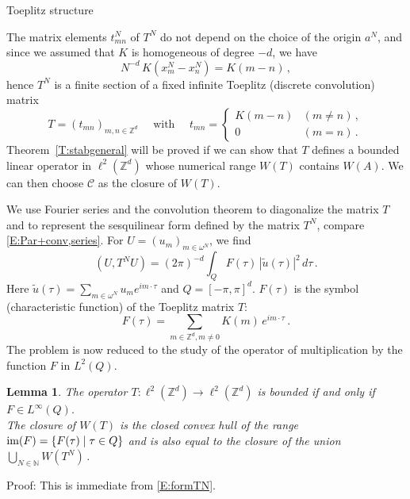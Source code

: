 \documentclass[12pt]{amsart}
\makeatletter
\def\subsection{\@startsection{section}{1}%
  \z@{1.2\linespacing\@plus\linespacing}{.5\linespacing}%
  {\normalfont\scshape\centering}}
\def\subsection{\@startsection{subsection}{2}%
  \z@{0.9\linespacing\@plus.7\linespacing}{-.5em}%
  {\normalfont\bfseries}}
\newtheorem{lemma}[theorem]{Lemma}
\theoremstyle{definition}
\theoremstyle{remark}
\numberwithin{equation}{section}
\newcommand{\im}{\operatorname{\rm im}}
\newcommand\N{{\mathbb N}}
\newcommand\Z{{\mathbb Z}}
\newcommand\cC{{\mathcal{C}}}
\makeatother
\begin{document}
\subsection{Toeplitz structure}\label{SS:Toeplitz}\ 

The matrix elements $t^{N}_{mn}$ of $T^{N}$ do not depend on the choice of the origin $a^{N}$, and
since we assumed that $K$ is homogeneous of degree $-d$, we have
$$
  N^{-d}\, K(x^{N}_{m}-x^{N}_{n}) = K(m-n)\,,
$$
hence $T^{N}$ is a finite section of a fixed infinite Toeplitz (discrete convolution) matrix 
\begin{equation}
\label{E:Tinf}
 T = (t_{mn})_{m,n\in\Z^{d}}
\quad\mbox{ with }\quad
 t_{mn} = \begin{cases}
                K(m-n) &(m\ne n)\,,\\
                0 &(m=n)\,.
 				\end{cases}
\end{equation}
Theorem~\ref{T:stabgeneral} will be proved if we can show that $T$ defines a bounded linear operator in $\ell^{2}(\Z^{d})$ whose numerical range $W(T)$ contains $W(A)$. We can then choose $\cC$ as the closure of $W(T)$.

We use Fourier series and the convolution theorem to diagonalize the matrix $T$ and to  represent the sesquilinear form defined by the matrix $T^{N}$, compare \eqref{E:Par+conv,series}. 
For $U=(u_{m})_{m\in\omega^{N}}$, we find
\begin{equation}
\label{E:formTN}
 (U,T^{N}U) = (2\pi)^{-d}\int_{Q} F(\tau)\,|\tilde u(\tau)|^{2}\,d\tau\,.
\end{equation}
Here $\tilde u(\tau)=\sum_{m\in\omega^{N}}u_{m}e^{im\cdot \tau}$ and $Q=[-\pi,\pi]^{d}$. $F(\tau)$ is the symbol (characteristic function) of the Toeplitz matrix $T$:
\begin{equation}
\label{E:F(t)}
 F(\tau) = \sum_{m\in\Z^{d},m\ne0}K(m)\,e^{im\cdot \tau}\,.
\end{equation}
The problem is now reduced to the study of the operator of multiplication by the function $F$ in $L^{2}(Q)$.
\begin{lemma}
 \label{L:TbyF}
 The operator $T:\ell^{2}(\Z^{d}) \to \ell^{2}(\Z^{d})$ is bounded if and only if $F\in L^{\infty}(Q)$.\\
 The closure of $W(T)$ is the closed convex hull of the range $\im(F)=\{F(\tau)\mid \tau\in Q\}$ and is also equal to the closure of the union 
 $\bigcup_{N\in\N}W(T^{N})$\,. 
\end{lemma}
Proof: This is immediate from \eqref{E:formTN}.
\end{document}
